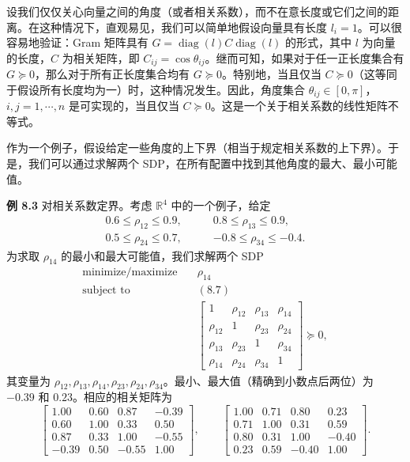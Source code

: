 \documentclass[UTF8, 12pt, fontset=fandol, oneside]{ctexart}
\begin{document}
设我们仅仅关心向量之间的角度（或者相关系数），而不在意长度或它们之间的距离。在这种情况下，直观易见，我们可以简单地假设向量具有长度 $l_i=1$。可以很容易地验证：Gram 矩阵具有 $G=\operatorname{diag}(l)C\operatorname{diag}(l)$ 的形式，其中 $l$ 为向量的长度，$C$ 为相关矩阵，即 $C_{ij}=\cos\theta_{ij}$。继而可知，如果对于任一正长度集合有 $G\succeq 0$，那么对于所有正长度集合均有 $G\succeq 0$。特别地，当且仅当 $C\succeq 0$（这等同于假设所有长度均为一）时，这种情况发生。因此，角度集合 $\theta_{ij}\in[0,\pi]$，$i,j=1,\cdots,n$ 是可实现的，当且仅当 $C\succeq 0$。这是一个关于相关系数的线性矩阵不等式。

作为一个例子，假设给定一些角度的上下界（相当于规定相关系数的上下界）。于是，我们可以通过求解两个 SDP，在所有配置中找到其他角度的最大、最小可能值。

\noindent\textbf{例 8.3}\quad
对相关系数定界。考虑 $\mathbb{R}^4$ 中的一个例子，给定
\begin{equation}
\begin{aligned}
0.6\leq \rho_{12}\leq 0.9,\qquad &0.8\leq \rho_{13}\leq 0.9,\\
0.5\leq \rho_{24}\leq 0.7,\qquad &-0.8\leq \rho_{34}\leq -0.4.
\end{aligned}
\tag{8.7}
\end{equation}
为求取 $\rho_{14}$ 的最小和最大可能值，我们求解两个 SDP
\[
\begin{aligned}
\text{minimize/maximize}\quad & \rho_{14}\\
\text{subject to}\quad & (8.7)\\
& \begin{bmatrix}
1 & \rho_{12} & \rho_{13} & \rho_{14}\\
\rho_{12} & 1 & \rho_{23} & \rho_{24}\\
\rho_{13} & \rho_{23} & 1 & \rho_{34}\\
\rho_{14} & \rho_{24} & \rho_{34} & 1
\end{bmatrix}\succeq 0,
\end{aligned}
\]
其变量为 $\rho_{12},\rho_{13},\rho_{14},\rho_{23},\rho_{24},\rho_{34}$。最小、最大值（精确到小数点后两位）为 $-0.39$ 和 $0.23$。相应的相关矩阵为
\[
\begin{bmatrix}
1.00 & 0.60 & 0.87 & -0.39\\
0.60 & 1.00 & 0.33 & 0.50\\
0.87 & 0.33 & 1.00 & -0.55\\
-0.39 & 0.50 & -0.55 & 1.00
\end{bmatrix},
\qquad
\begin{bmatrix}
1.00 & 0.71 & 0.80 & 0.23\\
0.71 & 1.00 & 0.31 & 0.59\\
0.80 & 0.31 & 1.00 & -0.40\\
0.23 & 0.59 & -0.40 & 1.00
\end{bmatrix}.
\]
\end{document}
